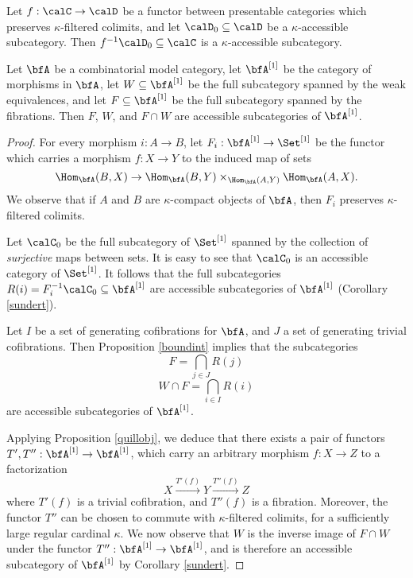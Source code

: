 \begin{Model Categories}
\begin{corollary}\label{sundert}
Let $f: \calC \rightarrow \calD$ be a functor between presentable categories which preserves $\kappa$-filtered colimits, and let $\calD_0 \subseteq \calD$ be a $\kappa$-accessible subcategory. Then $f^{-1} \calD_0 \subseteq \calC$ is a $\kappa$-accessible subcategory.
\end{corollary}

\begin{corollary}[Smith]\label{smitty}
Let $\bfA$ be a combinatorial model category, let $\bfA^{[1]}$ be the category of morphisms in $\bfA$, let $W \subseteq \bfA^{[1]}$ be the full subcategory spanned by the weak equivalences, and let
$F \subseteq \bfA^{[1]}$ be the full subcategory spanned by the fibrations. Then
$F$, $W$, and $F \cap W$ are accessible subcategories of $\bfA^{[1]}$. 
\end{corollary}

\begin{proof}
For every morphism $i: A \rightarrow B$, let $F_i: \bfA^{[1]} \rightarrow \Set^{[1]}$ be the functor which carries a morphism $f: X \rightarrow Y$ to the induced map of sets
$$ \Hom_{\bfA}(B, X) \rightarrow \Hom_{\bfA}(B,Y) \times_{ \Hom_{\bfA}(A,Y) } \Hom_{\bfA}(A,X).$$
We observe that if $A$ and $B$ are $\kappa$-compact objects of $\bfA$, then $F_i$ preserves $\kappa$-filtered colimits.

Let $\calC_0$ be the full subcategory of $\Set^{[1]}$ spanned by the collection of {\em surjective} maps between sets. It is easy to see that $\calC_0$ is an accessible category of $\Set^{[1]}$. It follows that the full subcategories $R(i) = F_i^{-1} \calC_0 \subseteq \bfA^{[1]}$ are accessible subcategories of $\bfA^{[1]}$ (Corollary \ref{sundert}). 

Let $I$ be a set of generating cofibrations for $\bfA$, and $J$ a set of generating trivial cofibrations. Then Proposition \ref{boundint} implies that the subcategories
$$ F = \bigcap_{j \in J} R(j)$$
$$ W \cap F = \bigcap_{i \in I} R(i)$$
are accessible subcategories of $\bfA^{[1]}$. 

Applying Proposition \ref{quillobj}, we deduce that there exists a pair of functors
$T', T'': \bfA^{[1]} \rightarrow \bfA^{[1]}$, which carry an arbitrary morphism $f: X \rightarrow Z$ to a factorization
$$ X \stackrel{ T'(f) }{\rightarrow} Y \stackrel{T''(f)}{\rightarrow} Z$$
where $T'(f)$ is a trivial cofibration, and $T''(f)$ is a fibration. Moreover, the functor $T''$ can be chosen to commute with $\kappa$-filtered colimits, for a sufficiently large regular cardinal $\kappa$. We now observe that $W$ is the inverse image of $F \cap W$ under the functor
$T'': \bfA^{[1]} \rightarrow \bfA^{[1]}$, and is therefore an accessible subcategory of
$\bfA^{[1]}$ by Corollary \ref{sundert}.
\end{proof}


\end{Model Categories}
